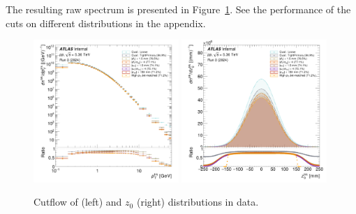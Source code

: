 The resulting raw spectrum is presented in Figure~\ref {fig:trk_pt_cutflow}. See the performance of the cuts on different distributions in the appendix.
\begin{figure}[h]
    \centering
    \includegraphics[width=0.49\textwidth]{images/trk_pt_cutflow_.png}
        \includegraphics[width=0.49\textwidth]{images/trk_Z0_cutflow_.png}
    \caption{Cutflow of \pT (left) and $z_0$ (right) distributions in \pp data. 
    }
    \label{fig:trk_pt_cutflow}
\end{figure}



